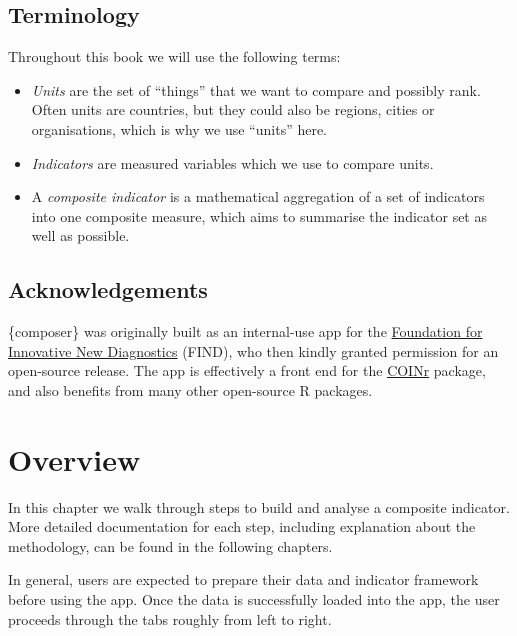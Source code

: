 \documentclass[
  letterpaper,
  DIV=11,
  numbers=noendperiod]{scrreprt}
\providecommand{\tightlist}{%
  \setlength{\itemsep}{0pt}\setlength{\parskip}{0pt}}\usepackage{longtable,booktabs,array}
\begin{document}
\hypertarget{terminology}{%
\section{Terminology}\label{terminology}}

Throughout this book we will use the following terms:

\begin{itemize}
\tightlist
\item
  \emph{Units} are the set of ``things'' that we want to compare and
  possibly rank. Often units are countries, but they could also be
  regions, cities or organisations, which is why we use ``units'' here.
\item
  \emph{Indicators} are measured variables which we use to compare
  units.
\item
  A \emph{composite indicator} is a mathematical aggregation of a set of
  indicators into one composite measure, which aims to summarise the
  indicator set as well as possible.
\end{itemize}

\hypertarget{acknowledgements}{%
\section{Acknowledgements}\label{acknowledgements}}

\{composer\} was originally built as an internal-use app for the
\href{https://www.finddx.org/}{Foundation for Innovative New
Diagnostics} (FIND), who then kindly granted permission for an
open-source release. The app is effectively a front end for the
\href{https://bluefoxr.github.io/COINr/}{COINr} package, and also
benefits from many other open-source R packages.


\hypertarget{sec-overview}{%
\chapter{Overview}\label{sec-overview}}

In this chapter we walk through steps to build and analyse a composite
indicator. More detailed documentation for each step, including
explanation about the methodology, can be found in the following
chapters.

In general, users are expected to prepare their data and indicator
framework before using the app. Once the data is successfully loaded
into the app, the user proceeds through the tabs roughly from left to
right.
\end{document}
